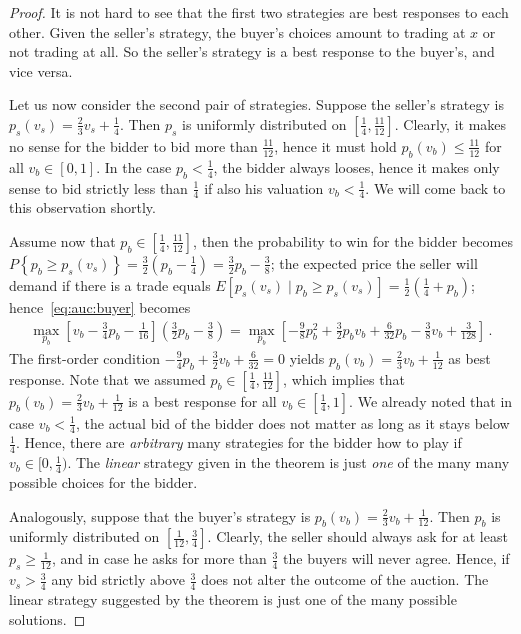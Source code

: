 \begin{proof}
It is not hard to see that the first two strategies are best responses to each other. Given the seller's strategy, the buyer's choices amount to trading at $x$ or not trading at all. So the seller's strategy is a best response to the buyer's, and vice versa.

Let us now consider the second pair of strategies. Suppose the seller's strategy is $p_s(v_s) = \frac{2}{3} v_s + \frac{1}{4}$. Then $p_s$ is uniformly distributed on $[\frac{1}{4}, \frac{11}{12}]$. Clearly, it makes no sense for the bidder to bid more than $\frac{11}{12}$, hence it must hold $p_b(v_b) \leq \frac{11}{12}$ for all $v_b \in [0,1]$. In the case $p_b < \frac{1}{4}$, the bidder always looses, hence it makes only sense to bid strictly less than $\frac{1}{4}$ if also his valuation $v_b < \frac{1}{4}$. We will come back to this observation shortly.

Assume now that $p_b \in [\frac{1}{4}, \frac{11}{12}]$, then the probability to win for the bidder becomes $P \left\{p_b \geq p_s(v_s) \right\} = \frac{3}{2} \left(p_b - \frac{1}{4}\right) = \frac{3}{2} p_b - \frac{3}{8}$; the expected price the seller will demand if there is a trade equals $E\left[p_s(v_s) \mid p_b \geq p_s(v_s)\right] = \frac{1}{2} \left( \frac{1}{4} + p_b\right)$; hence~\eqref{eq:auc:buyer} becomes
\begin{align*}
 \max_{p_b} \left[ v_b - \frac{3}{4} p_b - \frac{1}{16} \right] \left( \frac{3}{2} p_b - \frac{3}{8} \right) = \max_{p_b} \left[- \frac{9}{8} p_b^2 + \frac{3}{2} p_b v_b + \frac{6}{32} p_b - \frac{3}{8} v_b + \frac{3}{128} \right] \,.
\end{align*}
The first-order condition $- \frac{9}{4} p_b + \frac{3}{2}v_b + \frac{6}{32}  = 0 $ yields $p_b(v_b)=\frac{2}{3} v_b + \frac{1}{12}$ as best response. Note that we assumed $p_b \in [\frac{1}{4}, \frac{11}{12}]$, which implies that $p_b(v_b)=\frac{2}{3} v_b + \frac{1}{12}$ is a best response for all $v_b \in [\frac{1}{4},1]$. We already noted that in case $v_b < \frac{1}{4}$, the actual bid of the bidder does not matter as long as it stays below $\frac{1}{4}$. Hence, there are \emph{arbitrary} many strategies for the bidder how to play if $v_b \in [0,\frac{1}{4})$. The \emph{linear} strategy given in the theorem is just \emph{one} of the many many possible choices for the bidder.

Analogously, suppose that the buyer's strategy is $p_b(v_b)=\frac{2}{3} v_b + \frac{1}{12}$. Then $p_b$ is uniformly distributed on $[\frac{1}{12},\frac{3}{4}]$. Clearly, the seller should always ask for at least $p_s \geq \frac{1}{12}$, and in case he asks for more than $\frac{3}{4}$ the buyers will never agree. Hence, if $v_s > \frac{3}{4}$ any bid strictly above $\frac{3}{4}$ does not alter the outcome of the auction. The linear strategy suggested by the theorem is just one of the many possible solutions.


\end{proof}
